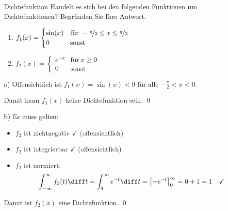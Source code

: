\begin{example}{Dichtefunktion}
    Handelt es sich bei den folgenden Funktionen um Dichtefunktionen?
    Begründen Sie Ihre Antwort.

    \begin{enumerate}[\alph*)]
        \item $f_1(x) =
                  \begin{cases}
                      \sin(x) & \text{für} \ -\nicefrac{\pi}{2} \leq x \leq \nicefrac{\pi}{2} \\
                      0       & \text{sonst}
                  \end{cases}
              $
        \item $f_2(x) =
                  \begin{cases}
                      e^{-x} & \text{für} \ x \geq 0 \\
                      0      & \text{sonst}
                  \end{cases}
              $
    \end{enumerate}

    \exampleseparator

    a) Offensichtlich ist $f_1(x) = \sin(x) < 0$ für alle $-\frac{\pi}{2} < x < 0$.

    Damit kann $f_1(x)$ keine Dichtefunktion sein.
    \qed

    b) Es muss gelten:
    \begin{itemize}
        \item $f_2$ ist nichtnegativ \quad $\checkmark$ (offensichtlich)
        \item $f_2$ ist integrierbar \quad $\checkmark$ (offensichtlich)
        \item $f_2$ ist normiert:
              \[
                  \int^{\infty}_{-\infty} f_2(t) \diff t = \int^{\infty}_{0} e^{-t} \diff t = \left[-e^{-t}\right]^{\infty}_{0} = 0 + 1 = 1 \quad \checkmark
              \]
    \end{itemize}

    Damit ist $f_2(x)$ eine Dichtefunktion.
    \qed
\end{example}

